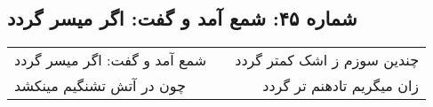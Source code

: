 \begin{center}
\section*{شماره ۴۵: شمع آمد و گفت: اگر میسر گردد}
\label{sec:045}
\begin{longtable}{l p{0.5cm} r}
شمع آمد و گفت: اگر میسر گردد
&&
چندین سوزم ز اشک کمتر گردد
\\
چون در آتش تشنگیم مینکشد
&&
زان میگریم تادهنم تر گردد
\\
\end{longtable}
\end{center}
